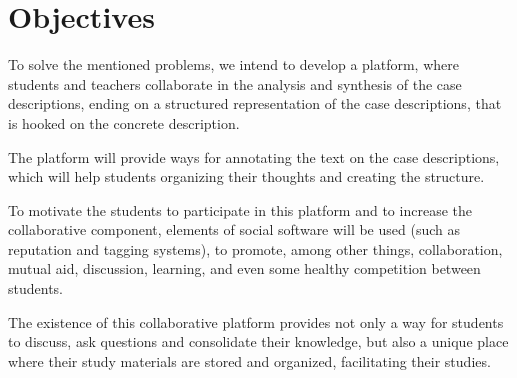 
\chapter{Objectives}
\label{chapter:objectives}
To solve the mentioned problems, we intend to develop a platform, where students and teachers collaborate in the analysis and synthesis of the case descriptions, ending on a structured representation of the case descriptions, that is hooked on the concrete description. 

The platform will provide ways for annotating the text on the case descriptions, which will help students organizing their thoughts and creating the structure. 

To motivate the students to participate in this platform and to increase the collaborative component, elements of social software will be used (such as reputation and tagging systems), to promote, among other things, collaboration, mutual aid, discussion, learning, and even some healthy competition between students.
 
The existence of this collaborative platform provides not only a way for students to discuss, ask questions and consolidate their knowledge, but also a unique place where their study materials are stored and organized, facilitating their studies.
